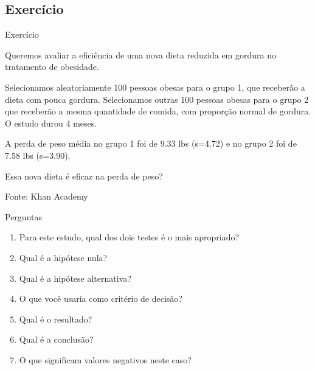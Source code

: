 \documentclass{beamer}
\begin{document}
\subsection{Exercício}

\begin{frame}{Exercício}
  \begin{exampleblock}{}
    \small
    Queremos avaliar a eficiência de uma nova dieta reduzida em
    gordura no tratamento de obesidade.

    \bigskip
    {\footnotesize
      Selecionamos aleatoriamente 100 pessoas obesas para o grupo 1, que receberão a dieta com pouca gordura.
      Selecionamos outras 100 pessoas obesas para o grupo 2 que receberão a mesma quantidade de comida, com proporção normal de gordura.
      O estudo durou 4 meses.
    }

    \bigskip
    \begin{exampleblock}{}
      \footnotesize
      A perda de peso média no grupo 1 foi de 9.33 lbs
      (s=4.72) e no grupo 2 foi de 7.58 lbs (s=3.90).
    \end{exampleblock}
  \end{exampleblock}
  \begin{block}{}
    Essa nova dieta é eficaz na perda de peso?
  \end{block}
  \hfill {\footnotesize Fonte: Khan Academy}
\end{frame}

\begin{frame}[label=perguntas]{Perguntas}
  \begin{enumerate}
  \item Para este estudo, qual dos dois testes é o mais apropriado?
  \item Qual é a hipótese nula?
  \item Qual é a hipótese alternativa?
  \item O que você usaria como critério de decisão?
  \item Qual é o resultado?
  \item Qual é a conclusão?
  \item O que significam valores negativos neste caso?
  \end{enumerate}
\end{frame}
\end{document}
